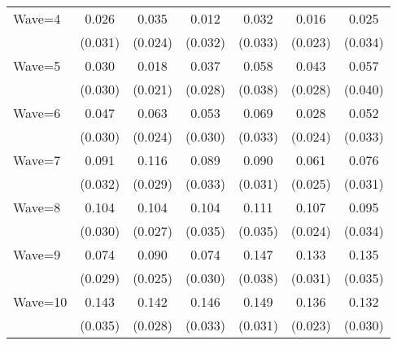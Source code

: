 {\begin{tabular}{l*{6}{c}}
Wave=4              &       0.026         &       0.035         &       0.012         &       0.032         &       0.016         &       0.025         \\
                    &     (0.031)         &     (0.024)         &     (0.032)         &     (0.033)         &     (0.023)         &     (0.034)         \\
Wave=5              &       0.030         &       0.018         &       0.037         &       0.058         &       0.043         &       0.057         \\
                    &     (0.030)         &     (0.021)         &     (0.028)         &     (0.038)         &     (0.028)         &     (0.040)         \\
Wave=6              &       0.047         &       0.063\sym{***}&       0.053\sym{*}  &       0.069\sym{**} &       0.028         &       0.052         \\
                    &     (0.030)         &     (0.024)         &     (0.030)         &     (0.033)         &     (0.024)         &     (0.033)         \\
Wave=7              &       0.091\sym{***}&       0.116\sym{***}&       0.089\sym{***}&       0.090\sym{***}&       0.061\sym{**} &       0.076\sym{**} \\
                    &     (0.032)         &     (0.029)         &     (0.033)         &     (0.031)         &     (0.025)         &     (0.031)         \\
Wave=8              &       0.104\sym{***}&       0.104\sym{***}&       0.104\sym{***}&       0.111\sym{***}&       0.107\sym{***}&       0.095\sym{***}\\
                    &     (0.030)         &     (0.027)         &     (0.035)         &     (0.035)         &     (0.024)         &     (0.034)         \\
Wave=9              &       0.074\sym{**} &       0.090\sym{***}&       0.074\sym{**} &       0.147\sym{***}&       0.133\sym{***}&       0.135\sym{***}\\
                    &     (0.029)         &     (0.025)         &     (0.030)         &     (0.038)         &     (0.031)         &     (0.035)         \\
Wave=10             &       0.143\sym{***}&       0.142\sym{***}&       0.146\sym{***}&       0.149\sym{***}&       0.136\sym{***}&       0.132\sym{***}\\
                    &     (0.035)         &     (0.028)         &     (0.033)         &     (0.031)         &     (0.023)         &     (0.030)         \\

\end{tabular}}
